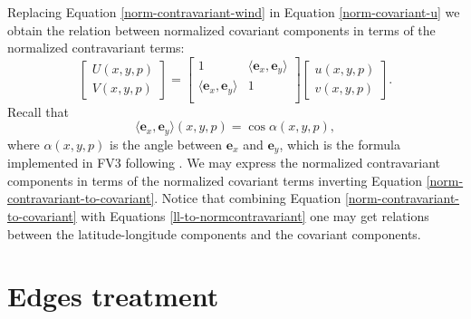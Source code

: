Replacing Equation \eqref{norm-contravariant-wind} in 
Equation \eqref{norm-covariant-u} we obtain
the relation between normalized covariant components in terms of the
normalized contravariant terms:
\begin{equation}
	\label{norm-contravariant-to-covariant}
	\begin{bmatrix}
		{U}(x,y,p) \\
		{V}(x,y,p)
	\end{bmatrix}
	=
	\begin{bmatrix}
		1 
		& \langle 	\boldsymbol{e}_x, \boldsymbol{e}_y \rangle \\
		\langle 	\boldsymbol{e}_x, \boldsymbol{e}_y \rangle 
		& 1\\
	\end{bmatrix}
	\begin{bmatrix}
		{u} (x,y,p) \\
		{v} (x,y,p) 
	\end{bmatrix}.
\end{equation}
Recall that
\begin{equation}
\langle 	\boldsymbol{e}_x, \boldsymbol{e}_y \rangle(x,y,p) = \cos \alpha(x,y,p),
\end{equation}
where $\alpha(x,y,p)$ is the angle between $\boldsymbol{e}_x$ and $\boldsymbol{e}_y$, which
is the formula implemented in FV3 following \citet{putman:2007}.
We may express the normalized contravariant components in terms of 
the normalized covariant terms inverting Equation \eqref{norm-contravariant-to-covariant}.
Notice that combining Equation \eqref{norm-contravariant-to-covariant} with Equations
\eqref{ll-to-normcontravariant}
one may get relations between the latitude-longitude 
components and the covariant components.


\section{Edges treatment}
\label{cs-halodata}

